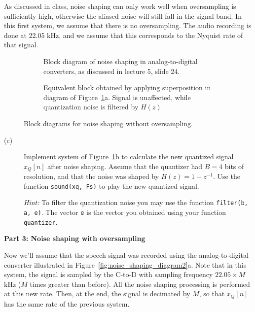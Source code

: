 \documentclass[12pt]{report}
\begin{document}
As discussed in class, noise shaping can only work well when oversampling is sufficiently high, otherwise the aliased noise will still fall in the signal band. In this first system, we assume that there is no oversampling. The audio recording is done at 22.05 kHz, and we assume that this corresponds to the Nyquist rate of that signal. 
	
\begin{figure}[t]
	\centering
	\begin{subfigure}{\textwidth}
		\centering
		\resizebox{0.7\textwidth}{!}{}
		\caption{Block diagram of noise shaping in analog-to-digital converters, as discussed in lecture 5, slide 24.} 
	\end{subfigure}
	
	\begin{subfigure}{\textwidth}
		\centering
		\def\UPSAMPLE{1}
		\resizebox{0.4\textwidth}{!}{}
		\caption{Equivalent block obtained by applying superposition in diagram of Figure~\ref{fig:noise_shaping_diagram}a. Signal is unaffected, while quantization noise is filtered by $H(z)$}
	\end{subfigure}%
	\caption{Block diagrams for noise shaping without oversampling.} \label{fig:noise_shaping_diagram}
\end{figure}
	
\begin{description}		
	\item[(c)] Implement system of Figure~\ref{fig:noise_shaping_diagram}b to calculate the new quantized signal $x_Q[n]$ after noise shaping. Assume that the quantizer had $B = 4$ bits of resolution, and that the noise was shaped by $H(z) = 1 - z^{-1}$. Use the function \texttt{sound(xq, Fs)} to play the new quantized signal.  
	
	\textit{Hint:} To filter the quantization noise you may use the function \texttt{filter(b, a, e)}. The vector \texttt{e} is the vector you obtained using your function \texttt{quantizer}.
\end{description}

\noindent\textbf{Part 3: Noise shaping with oversampling}

Now we'll assume that the speech signal was recorded using the analog-to-digital converter illustrated in Figure~\ref{fig:noise_shaping_diagram2}a. Note that in this system, the signal is sampled by the C-to-D with sampling frequency $22.05\times M$ kHz ($M$ times greater than before). All the noise shaping processing is performed at this new rate. Then, at the end, the signal is decimated by $M$, so that $x_Q[n]$ has the same rate of the previous system.
\end{document}
